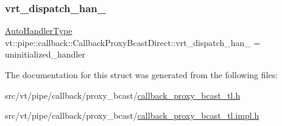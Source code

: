 \subsubsection{\texorpdfstring{vrt\+\_\+dispatch\+\_\+han\+\_\+}{vrt\_dispatch\_han\_}}
{\footnotesize\ttfamily \hyperlink{structvt_1_1pipe_1_1callback_1_1_callback_proxy_bcast_direct_a543cd86434430bd048952534f4fbc128}{Auto\+Handler\+Type} vt\+::pipe\+::callback\+::\+Callback\+Proxy\+Bcast\+Direct\+::vrt\+\_\+dispatch\+\_\+han\+\_\+ = uninitialized\+\_\+handler\hspace{0.3cm}{\ttfamily [private]}}



The documentation for this struct was generated from the following files\+:\begin{DoxyCompactItemize}
\item 
src/vt/pipe/callback/proxy\+\_\+bcast/\hyperlink{callback__proxy__bcast__tl_8h}{callback\+\_\+proxy\+\_\+bcast\+\_\+tl.\+h}\item 
src/vt/pipe/callback/proxy\+\_\+bcast/\hyperlink{callback__proxy__bcast__tl_8impl_8h}{callback\+\_\+proxy\+\_\+bcast\+\_\+tl.\+impl.\+h}\end{DoxyCompactItemize}
